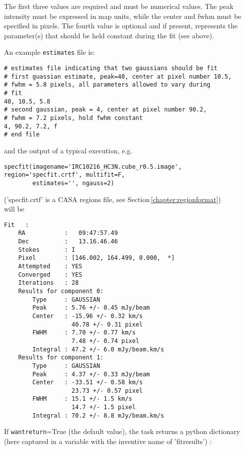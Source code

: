 The first three values are required and must be numerical values. The
peak intensity must be expressed in map units, while the
center and fwhm must be specified in pixels. The fourth value is
optional and if present, represents the parameter(s)
that should be held constant during the fit (see above).

An example {\tt estimates} file is: 

\small
\begin{verbatim}
# estimates file indicating that two gaussians should be fit
# first guassian estimate, peak=40, center at pixel number 10.5, 
# fwhm = 5.8 pixels, all parameters allowed to vary during
# fit
40, 10.5, 5.8
# second gaussian, peak = 4, center at pixel number 90.2, 
# fwhm = 7.2 pixels, hold fwhm constant
4, 90.2, 7.2, f
# end file
\end{verbatim}
\normalsize



and the output of a typical execution, e.g. 

\small
\begin{verbatim}
specfit(imagename='IRC10216_HC3N.cube_r0.5.image', region='specfit.crtf', multifit=F,
        estimates='', ngauss=2)
\end{verbatim}
\normalsize
('specfit.crtf' is a CASA regions file, see
Section\,\ref{chapter:regionformat})\\

will be 


\small
\begin{verbatim}
Fit   :
    RA           :   09:47:57.49
    Dec          :   13.16.46.46
    Stokes       : I
    Pixel        : [146.002, 164.499, 0.000,  *]
    Attempted    : YES
    Converged    : YES
    Iterations   : 28
    Results for component 0:
        Type     : GAUSSIAN
        Peak     : 5.76 +/- 0.45 mJy/beam
        Center   : -15.96 +/- 0.32 km/s
                   40.78 +/- 0.31 pixel
        FWHM     : 7.70 +/- 0.77 km/s
                   7.48 +/- 0.74 pixel
        Integral : 47.2 +/- 6.0 mJy/beam.km/s
    Results for component 1:
        Type     : GAUSSIAN
        Peak     : 4.37 +/- 0.33 mJy/beam
        Center   : -33.51 +/- 0.58 km/s
                   23.73 +/- 0.57 pixel
        FWHM     : 15.1 +/- 1.5 km/s
                   14.7 +/- 1.5 pixel
        Integral : 70.2 +/- 8.8 mJy/beam.km/s
\end{verbatim}
\normalsize

If {\tt wantreturn}=True (the default value), the task
returns a python dictionary (here captured in a variable
with the inventive name of 'fitresults') : 

